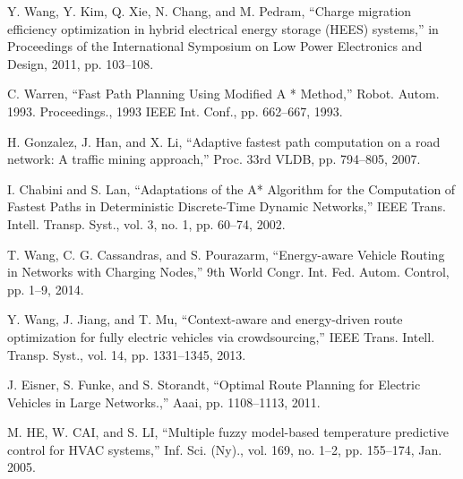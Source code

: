 	Y. Wang, Y. Kim, Q. Xie, N. Chang, and M. Pedram, “Charge migration efficiency optimization in hybrid electrical energy storage (HEES) systems,” in Proceedings of the International Symposium on Low Power Electronics and Design, 2011, pp. 103–108.

	C. Warren, “Fast Path Planning Using Modified A * Method,” Robot. Autom. 1993. Proceedings., 1993 IEEE Int. Conf., pp. 662–667, 1993.

	H. Gonzalez, J. Han, and X. Li, “Adaptive fastest path computation on a road network: A traffic mining approach,” Proc. 33rd VLDB, pp. 794–805, 2007.

	I. Chabini and S. Lan, “Adaptations of the A* Algorithm for the Computation of Fastest Paths in Deterministic Discrete-Time Dynamic Networks,” IEEE Trans. Intell. Transp. Syst., vol. 3, no. 1, pp. 60–74, 2002.


	T. Wang, C. G. Cassandras, and S. Pourazarm, “Energy-aware Vehicle Routing in Networks with Charging Nodes,” 9th World Congr. Int. Fed. Autom. Control, pp. 1–9, 2014.


	Y. Wang, J. Jiang, and T. Mu, “Context-aware and energy-driven route optimization for fully electric vehicles via crowdsourcing,” IEEE Trans. Intell. Transp. Syst., vol. 14, pp. 1331–1345, 2013.


	J. Eisner, S. Funke, and S. Storandt, “Optimal Route Planning for Electric Vehicles in Large Networks.,” Aaai, pp. 1108–1113, 2011.


	M. HE, W. CAI, and S. LI, “Multiple fuzzy model-based temperature predictive control for HVAC systems,” Inf. Sci. (Ny)., vol. 169, no. 1–2, pp. 155–174, Jan. 2005.

